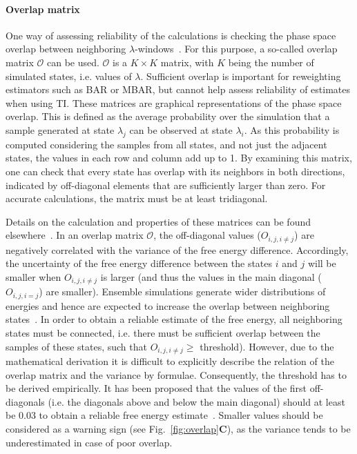 \paragraph{Overlap matrix}
One way of assessing reliability of the calculations is checking the phase space overlap between neighboring $\lambda$-windows~\cite{wu2005phasespace, wu2005phasespacea}. For this purpose, a so-called overlap matrix $\mathcal{O}$ can be used. $\mathcal{O}$ is a $K\times K$ matrix, with $K$ being the number of simulated states, i.e. values of $\lambda$. Sufficient overlap is important for reweighting estimators such as BAR or MBAR, but cannot help assess reliability of estimates when using TI. 
These matrices are graphical representations of the phase space overlap. This is defined as the average probability over the simulation that a sample generated at state $\lambda_{j}$ can be observed at state $\lambda_i$. As this probability is computed considering the samples from all states, and not just the adjacent states, the values in each row and column add up to 1. By examining this matrix, one can check that every state has overlap with its neighbors in both directions, indicated by off-diagonal elements that are sufficiently larger than zero. For accurate calculations, the matrix must be at least tridiagonal.

Details on the calculation and properties of these matrices can be found elsewhere~\cite{klimovich2015guidelines}.
In an overlap matrix $\mathcal{O}$, the off-diagonal values (${O}_{i,j,i\ne j}$) are negatively correlated with the variance of the free energy difference. Accordingly, the uncertainty of the free energy difference between the states $i$ and $j$ will be smaller when ${O}_{i,j,i\ne j}$ is larger (and thus the values in the main diagonal (${O}_{i,j,i=j}$) are smaller). 
Ensemble simulations generate wider distributions of energies and hence are expected to increase the overlap between neighboring states~\cite{wade2022}.
In order to obtain a reliable estimate of the free energy, all neighboring states must be connected, i.e. there must be sufficient overlap between the samples of these states, such that ${O}_{i,j,i\ne j}\ge$ threshold).
However, due to the mathematical derivation it is difficult to explicitly describe the relation of the overlap matrix and the variance by formulae. Consequently, the threshold has to be derived empirically. It has been proposed that the values of the first off-diagonals (i.e. the diagonals above and below the main diagonal) should at least be 0.03 to obtain a reliable free energy estimate~\cite{klimovich2015guidelines}. Smaller values should be considered as a warning sign (see Fig.~\ref{fig:overlap}\textbf{C}), as the variance tends to be underestimated in case of poor overlap.


